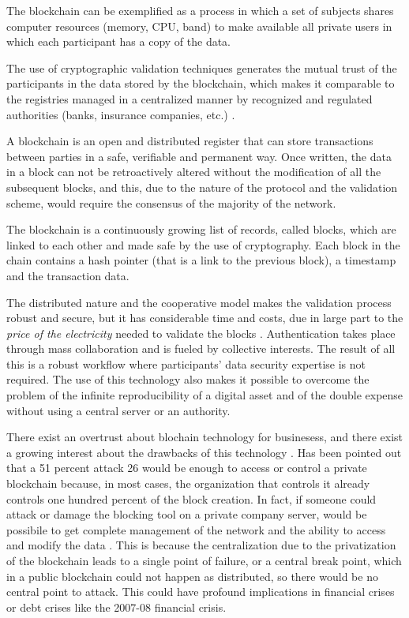 \documentclass[]{book}
\begin{document}
The blockchain can be exemplified as a process in which a set of
subjects shares computer resources (memory, CPU, band) to make available
all private users in which each participant has a copy of the data.

The use of cryptographic validation techniques generates the mutual
trust of the participants in the data stored by the blockchain, which
makes it comparable to the registries managed in a centralized manner by
recognized and regulated authorities (banks, insurance companies, etc.)
\citep{pilkington201611}.

A blockchain is an open and distributed register that can store
transactions between parties in a safe, verifiable and permanent way.
Once written, the data in a block can not be retroactively altered
without the modification of all the subsequent blocks, and this, due to
the nature of the protocol and the validation scheme, would require the
consensus of the majority of the network. \citep{iansiti2017truth}

The blockchain is a continuously growing list of records, called blocks,
which are linked to each other and made safe by the use of cryptography.
Each block in the chain contains a hash pointer (that is a link to the
previous block), a timestamp and the transaction data.

The distributed nature and the cooperative model makes the validation
process robust and secure, but it has considerable time and costs, due
in large part to the \emph{price of the electricity} needed to validate
the blocks \citep{underwood2016blockchain}. Authentication takes place
through mass collaboration and is fueled by collective interests. The
result of all this is a robust workflow where participants' data
security expertise is not required. The use of this technology also
makes it possible to overcome the problem of the infinite
reproducibility of a digital asset and of the double expense without
using a central server or an authority. \citep{karame2012double}

There exist an overtrust about blochain technology for businesess, and
there exist a growing interest about the drawbacks of this technology
\citep{eyal2018majority, lin2017survey, yli2016current}. Has been
pointed out that a 51 percent attack 26 would be enough to access or
control a private blockchain because, in most cases, the organization
that controls it already controls one hundred percent of the block
creation. In fact, if someone could attack or damage the blocking tool
on a private company server, would be possibile to get complete
management of the network and the ability to access and modify the data
\citep{hampton2016understanding}. This is because the centralization due
to the privatization of the blockchain leads to a single point of
failure, or a central break point, which in a public blockchain could
not happen as distributed, so there would be no central point to attack.
This could have profound implications in financial crises or debt crises
like the 2007-08 financial crisis.
\end{document}
